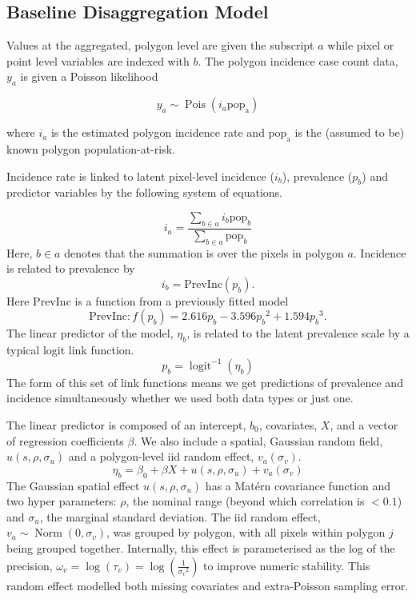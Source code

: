 \documentclass{statsoc}
\begin{document}
\subsection*{Baseline Disaggregation Model}

Values at the aggregated, polygon level are given the subscript $a$ while pixel or point level variables are indexed with $b$.
The polygon incidence case count data, $y_a$ is given a Poisson likelihood

$$y_a \sim \operatorname{Pois}(i_a\mathrm{pop_a})$$

where $i_a$ is the estimated polygon incidence rate and $\mathrm{pop_a}$ is the (assumed to be) known polygon population-at-risk.


Incidence rate is linked to latent pixel-level incidence ($i_b$), prevalence ($p_b$) and predictor variables by the following system of equations.

$$i_a = \frac{ \sum_{b \in a}i_b \mathrm{pop}_b}{\sum_{b \in a}\mathrm{pop}_b} $$
Here, $b \in a$ denotes that the summation is over the pixels in polygon $a$. 
Incidence is related to prevalence by
$$i_b = \mathrm{PrevInc}(p_b).$$
Here $\mathrm{PrevInc}$ is a function from a previously fitted model \citep{cameron2015defining} 
$$\mathrm{PrevInc}: f\left(p_b\right) = 2.616p_b - 3.596{p_b}^2 + 1.594{p_b}^3.$$
The linear predictor of the model, $\eta_b$, is related to the latent prevalence scale by a typical logit link function.
$$p_b = \operatorname{logit}^{-1}(\eta_b)$$
The form of this set of link functions means we get predictions of prevalence and incidence simultaneously whether we used both data types or just one.

The linear predictor is composed of an intercept, $b_0$, covariates, $X$, and a vector of regression coefficients $\beta$.
We also include a spatial, Gaussian random field, $u(s, \rho, \sigma_u)$ and a polygon-level iid random effect, $ v_a(\sigma_v)$.
$$\eta_b = \beta_0 + \beta X  + u(s, \rho, \sigma_u) + v_a(\sigma_v) $$
The Gaussian spatial effect $u(s, \rho, \sigma_u)$ has a Mat\'ern covariance function and two hyper parameters: $\rho$, the nominal range (beyond which correlation is $< 0.1$) and $\sigma_u$, the marginal standard deviation.
The iid random effect, $v_a \sim \operatorname{Norm}(0, \sigma_v)$,  was grouped by polygon, with all pixels within polygon $j$ being grouped together.
Internally, this effect is parameterised as the log of the precision, $\omega_v = \log(\tau_v) = \log(\frac{1}{{\sigma_v}^2})$ to improve numeric stability.
This random effect modelled both missing covariates and extra-Poisson sampling error.
\end{document}

